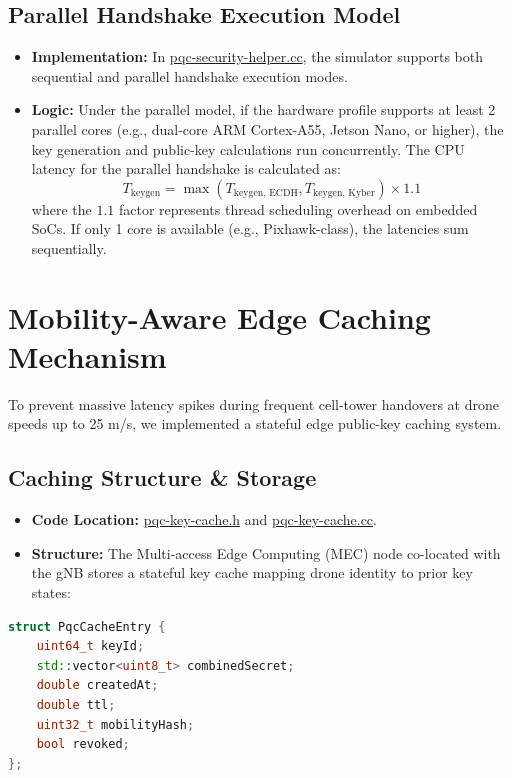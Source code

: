 \documentclass[11pt,a4paper]{article}
\begin{document}
\subsection{Parallel Handshake Execution Model}
\begin{itemize}
    \item \textbf{Implementation:} In \href{file:///c:/wsl.localhost/Ubuntu-22.04/home/abishek14/Kyber-6G project/ns-3-dev/contrib/pqc-security/helper/pqc-security-helper.cc}{pqc-security-helper.cc}, the simulator supports both sequential and parallel handshake execution modes.
    \item \textbf{Logic:} Under the parallel model, if the hardware profile supports at least 2 parallel cores (e.g., dual-core ARM Cortex-A55, Jetson Nano, or higher), the key generation and public-key calculations run concurrently. The CPU latency for the parallel handshake is calculated as:
    \[ T_{\text{keygen}} = \max(T_{\text{keygen, ECDH}}, T_{\text{keygen, Kyber}}) \times 1.1 \]
    where the $1.1$ factor represents thread scheduling overhead on embedded SoCs. If only 1 core is available (e.g., Pixhawk-class), the latencies sum sequentially.
\end{itemize}

\hrulefill

\section{Mobility-Aware Edge Caching Mechanism}

To prevent massive latency spikes during frequent cell-tower handovers at drone speeds up to 25 m/s, we implemented a stateful edge public-key caching system.

\subsection{Caching Structure \& Storage}
\begin{itemize}
    \item \textbf{Code Location:} \href{file:///c:/wsl.localhost/Ubuntu-22.04/home/abishek14/Kyber-6G project/ns-3-dev/contrib/pqc-security/model/pqc-key-cache.h}{pqc-key-cache.h} and \href{file:///c:/wsl.localhost/Ubuntu-22.04/home/abishek14/Kyber-6G project/ns-3-dev/contrib/pqc-security/model/pqc-key-cache.cc}{pqc-key-cache.cc}.
    \item \textbf{Structure:} The Multi-access Edge Computing (MEC) node co-located with the gNB stores a stateful key cache mapping drone identity to prior key states:
\end{itemize}
\begin{lstlisting}[language=C++]
struct PqcCacheEntry {
    uint64_t keyId;
    std::vector<uint8_t> combinedSecret;
    double createdAt;
    double ttl;
    uint32_t mobilityHash;
    bool revoked;
};
\end{lstlisting}
\end{document}
